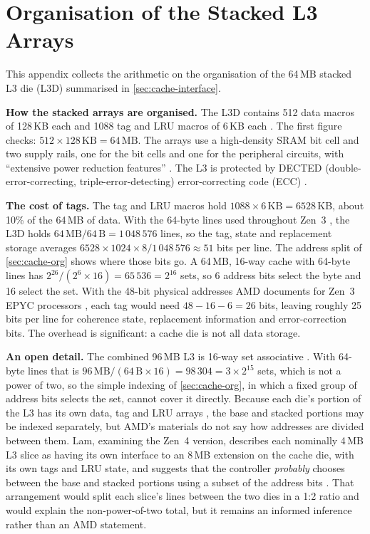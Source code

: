 \section{Organisation of the Stacked L3 Arrays}
\label{app:l3d-organisation}

This appendix collects the arithmetic on the organisation of the 64\,MB stacked L3 die (L3D) summarised in \cref{sec:cache-interface}.

\textbf{How the stacked arrays are organised.} The L3D contains 512 data macros of 128\,KB each and 1088 tag and LRU macros of 6\,KB each \cite[slide~25]{wuu2022vcache}. The first figure checks: $512 \times 128\,\text{KB} = 64\,\text{MB}$. The arrays use a high-density SRAM bit cell and two supply rails, one for the bit cells and one for the peripheral circuits, with ``extensive power reduction features'' \cite[slide~25]{wuu2022vcache}. The L3 is protected by DECTED (double-error-correcting, triple-error-detecting) error-correcting code (ECC) \cite[slide~19]{wuu2022vcache}.

\textbf{The cost of tags.} The tag and LRU macros hold $1088 \times 6\,\text{KB} = 6528$\,KB, about 10\% of the 64\,MB of data. With the 64-byte lines used throughout Zen~3 \cite{amd2022epyc7003}, the L3D holds $64\,\text{MB}/64\,\text{B} = 1\,048\,576$ lines, so the tag, state and replacement storage averages $6528 \times 1024 \times 8 / 1\,048\,576 \approx 51$ bits per line. The address split of \cref{sec:cache-org} shows where those bits go. A 64\,MB, 16-way cache with 64-byte lines has $2^{26}/(2^{6} \times 16) = 65\,536 = 2^{16}$ sets, so 6 address bits select the byte and 16 select the set. With the 48-bit physical addresses AMD documents for Zen~3 EPYC processors \cite[p.~10]{advancedmicrodevicesinc.UsingSEVAMD2023}, each tag would need $48 - 16 - 6 = 26$ bits, leaving roughly 25 bits per line for coherence state, replacement information and error-correction bits. The overhead is significant: a cache die is not all data storage.

\textbf{An open detail.} The combined 96\,MB L3 is 16-way set associative \cite[slide~20]{wuu2022vcache}. With 64-byte lines that is $96\,\text{MB} / (64\,\text{B} \times 16) = 98\,304 = 3 \times 2^{15}$ sets, which is not a power of two, so the simple indexing of \cref{sec:cache-org}, in which a fixed group of address bits selects the set, cannot cover it directly. Because each die's portion of the L3 has its own data, tag and LRU arrays \cite[slide~20]{wuu2022vcache}, the base and stacked portions may be indexed separately, but AMD's materials do not say how addresses are divided between them. Lam, examining the Zen~4 version, describes each nominally 4\,MB L3 slice as having its own interface to an 8\,MB extension on the cache die, with its own tags and LRU state, and suggests that the controller \emph{probably} chooses between the base and stacked portions using a subset of the address bits \cite{lamAMDs7950X3DZen2023}. That arrangement would split each slice's lines between the two dies in a 1:2 ratio and would explain the non-power-of-two total, but it remains an informed inference rather than an AMD statement.
\clearpage
